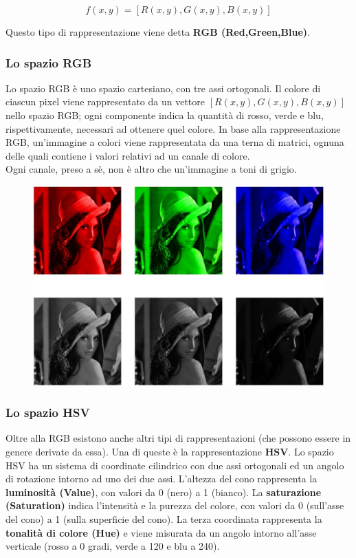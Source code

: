 $$
    f(x, y) = [R(x, y), G(x, y), B(x, y)]
$$

Questo tipo di rappresentazione viene detta \textbf{RGB (Red,Green,Blue)}.
\subsubsection{Lo spazio RGB}

Lo spazio RGB è uno spazio cartesiano, con tre assi ortogonali. Il colore di
ciascun pixel viene rappresentato da un vettore $[R(x , y), G(x , y), B(x , y)]$
nello spazio RGB; ogni componente indica la quantità di rosso, verde e blu,
rispettivamente, necessari ad ottenere quel colore. In base alla
rappresentazione RGB, un'immagine a colori viene rappresentata da una terna di
matrici, ognuna delle quali contiene i valori relativi ad un canale di colore.\\
Ogni canale, preso a sè, non è altro che un'immagine a toni di grigio.

\begin{figure}[H]
    \centering
    \includegraphics[width=12cm, keepaspectratio]{capitoli/immagini/imgs/canali_RGB_e_grigio.jpg}
\end{figure}

\subsubsection{Lo spazio HSV}

Oltre alla RGB esistono anche altri tipi di rappresentazioni (che possono essere
in genere derivate da essa). Una di queste è la rappresentazione \textbf{HSV}.
Lo spazio HSV ha un sistema di coordinate cilindrico con due assi ortogonali ed
un angolo di rotazione intorno ad uno dei due assi. L'altezza del cono
rappresenta la \textbf{luminosità (Value)}, con valori da 0 (nero) a 1 (bianco).
La \textbf{saturazione (Saturation)} indica l'intensità e la purezza del colore,
con valori da 0 (sull'asse del cono) a 1 (sulla superficie del cono). La terza
coordinata rappresenta la \textbf{tonalità di colore (Hue)} e viene misurata da
un angolo intorno all'asse verticale (rosso a 0 gradi, verde a 120 e blu a 240).

